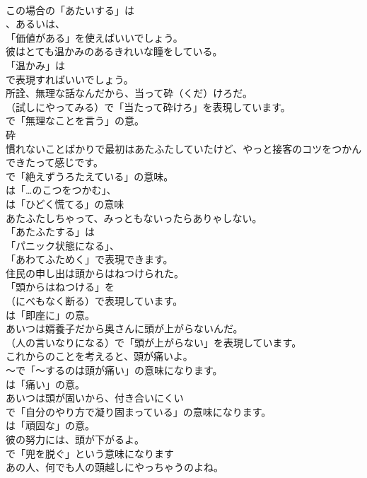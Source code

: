 \documentclass[8pt]{extreport}
\begin{document}
\begin{CJK}{UTF8}{min}
\\	この場合の「あたいする」は
\\	、あるいは、
\\	「価値がある」を使えばいいでしょう。	
\\	彼はとても温かみのあるきれいな瞳をしている。 
\\	「温かみ」は 
\\	で表現すればいいでしょう。	
\\	所詮、無理な話なんだから、当って砕（くだ）けろだ。 
\\	（試しにやってみる）で「当たって砕けろ」を表現しています。
\\	で「無理なことを言う」の意。	
\\	砕
\\	慣れないことばかりで最初はあたふたしていたけど、やっと接客のコツをつかんできたって感じです。 
\\	で「絶えずうろたえている」の意味。
\\	は「…のこつをつかむ」、
\\	は「ひどく慌てる」の意味	
\\	あたふたしちゃって、みっともないったらありゃしない。 
\\	「あたふたする」は
\\	「パニック状態になる」、
\\	「あわてふためく」で表現できます。	
\\	住民の申し出は頭からはねつけられた。 
\\	「頭からはねつける」を 
\\	（にべもなく断る）で表現しています。
\\	は「即座に」の意。	
\\	あいつは婿養子だから奥さんに頭が上がらないんだ。 
\\	（人の言いなりになる）で「頭が上がらない」を表現しています。	
\\	これからのことを考えると、頭が痛いよ。 
\\	～で「～するのは頭が痛い」の意味になります。
\\	は「痛い」の意。	
\\	あいつは頭が固いから、付き合いにくい 
\\	で「自分のやり方で凝り固まっている」の意味になります。
\\	は「頑固な」の意。	
\\	彼の努力には、頭が下がるよ。 
\\	で「兜を脱ぐ」という意味になります	
\\	あの人、何でも人の頭越しにやっちゃうのよね。 

\end{CJK}
\end{document}

